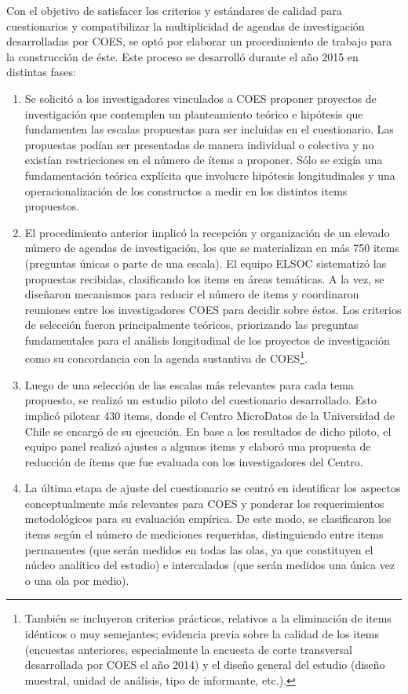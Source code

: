 \documentclass[12pt]{report}
\begin{document}
Con el objetivo de satisfacer los criterios y estándares de calidad para cuestionarios y compatibilizar la multiplicidad de agendas de investigación desarrolladas por COES, se optó por elaborar un procedimiento de trabajo para la construcción de éste. Este proceso se desarrolló durante el año 2015 en distintas fases:
\begin{enumerate}
	\item Se solicitó a los investigadores vinculados a COES proponer proyectos de investigación que contemplen un planteamiento teórico e hipótesis que fundamenten las escalas propuestas para ser incluidas en el cuestionario. Las propuestas podían ser presentadas de manera individual o colectiva y no existían restricciones en el número de ítems a proponer. Sólo se exigía una fundamentación teórica explícita que involucre hipótesis longitudinales y una operacionalización de los constructos a medir en los distintos items propuestos. 
	\item  El procedimiento anterior implicó la recepción y organización de un elevado número de agendas de investigación, los que se materializan en más 750 items (preguntas únicas o parte de una escala). El equipo ELSOC sistematizó las propuestas recibidas, clasificando los items en áreas temáticas. A la vez, se diseñaron mecanismos para reducir el número de items y coordinaron reuniones entre los investigadores COES para decidir sobre éstos. Los criterios de selección fueron principalmente teóricos, priorizando las preguntas fundamentales para el análisis longitudinal de los proyectos de investigación como su concordancia con la agenda sustantiva de COES\footnote{También se incluyeron criterios prácticos, relativos a la eliminación de items idénticos o muy semejantes; evidencia previa sobre la calidad de los items (encuestas anteriores, especialmente la encuesta de corte transversal desarrollada por COES el año 2014) y el diseño general del estudio (diseño muestral, unidad de análisis, tipo de informante, etc.).}.
	\item  Luego de una selección de las escalas más relevantes para cada tema propuesto, se realizó un estudio piloto del cuestionario desarrollado. Esto implicó pilotear 430 items, donde el Centro MicroDatos de la Universidad de Chile se encargó de su ejecución. En base a los resultados de dicho piloto, el equipo panel realizó ajustes a algunos items y elaboró una propuesta de reducción de ítems que fue evaluada con los investigadores del Centro. 
	\item  La última etapa de ajuste del cuestionario se centró en identificar los aspectos conceptualmente más relevantes para COES y ponderar los requerimientos metodológicos para su evaluación empírica. De este modo, se clasificaron los items según el número de mediciones requeridas, distinguiendo entre items permanentes (que serán medidos en todas las olas, ya que constituyen el núcleo analítico del estudio) e  intercalados (que serán medidos una única vez o una ola por medio). 
\end{enumerate}
\end{document}

